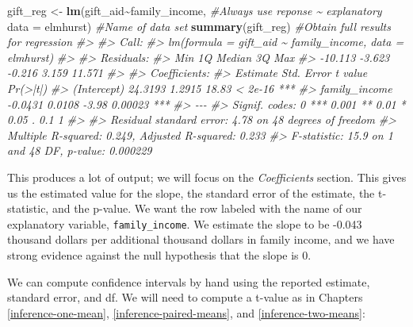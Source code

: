 \documentclass[
  10pt,
  openany]{book}
\newenvironment{Shaded}{\begin{snugshade}}{\end{snugshade}}
\newcommand{\AttributeTok}[1]{\textcolor[rgb]{0.13,0.29,0.53}{#1}}
\newcommand{\CommentTok}[1]{\textcolor[rgb]{0.56,0.35,0.01}{\textit{#1}}}
\newcommand{\FunctionTok}[1]{\textcolor[rgb]{0.13,0.29,0.53}{\textbf{#1}}}
\newcommand{\NormalTok}[1]{#1}
\newcommand{\OtherTok}[1]{\textcolor[rgb]{0.56,0.35,0.01}{#1}}
\newcommand{\SpecialCharTok}[1]{\textcolor[rgb]{0.81,0.36,0.00}{\textbf{#1}}}
\theoremstyle{definition}
\theoremstyle{definition}
\theoremstyle{definition}
\theoremstyle{definition}
\theoremstyle{remark}
\begin{document}
\begin{Shaded}
\begin{Highlighting}[]
\NormalTok{gift\_reg }\OtherTok{\textless{}{-}} \FunctionTok{lm}\NormalTok{(gift\_aid}\SpecialCharTok{\textasciitilde{}}\NormalTok{family\_income, }\CommentTok{\#Always use reponse \textasciitilde{} explanatory}
               \AttributeTok{data =}\NormalTok{ elmhurst)  }\CommentTok{\#Name of data set}
\FunctionTok{summary}\NormalTok{(gift\_reg)  }\CommentTok{\#Obtain full results for regression}
\CommentTok{\#\textgreater{} }
\CommentTok{\#\textgreater{} Call:}
\CommentTok{\#\textgreater{} lm(formula = gift\_aid \textasciitilde{} family\_income, data = elmhurst)}
\CommentTok{\#\textgreater{} }
\CommentTok{\#\textgreater{} Residuals:}
\CommentTok{\#\textgreater{}     Min      1Q  Median      3Q     Max }
\CommentTok{\#\textgreater{} {-}10.113  {-}3.623  {-}0.216   3.159  11.571 }
\CommentTok{\#\textgreater{} }
\CommentTok{\#\textgreater{} Coefficients:}
\CommentTok{\#\textgreater{}               Estimate Std. Error t value Pr(\textgreater{}|t|)    }
\CommentTok{\#\textgreater{} (Intercept)    24.3193     1.2915   18.83  \textless{} 2e{-}16 ***}
\CommentTok{\#\textgreater{} family\_income  {-}0.0431     0.0108   {-}3.98  0.00023 ***}
\CommentTok{\#\textgreater{} {-}{-}{-}}
\CommentTok{\#\textgreater{} Signif. codes:  0 \textquotesingle{}***\textquotesingle{} 0.001 \textquotesingle{}**\textquotesingle{} 0.01 \textquotesingle{}*\textquotesingle{} 0.05 \textquotesingle{}.\textquotesingle{} 0.1 \textquotesingle{} \textquotesingle{} 1}
\CommentTok{\#\textgreater{} }
\CommentTok{\#\textgreater{} Residual standard error: 4.78 on 48 degrees of freedom}
\CommentTok{\#\textgreater{} Multiple R{-}squared:  0.249,  Adjusted R{-}squared:  0.233 }
\CommentTok{\#\textgreater{} F{-}statistic: 15.9 on 1 and 48 DF,  p{-}value: 0.000229}
\end{Highlighting}
\end{Shaded}

This produces a lot of output; we will focus on the \emph{Coefficients} section. This gives us the estimated value for the slope, the standard error of the estimate, the t-statistic, and the p-value. We want the row labeled with the name of our explanatory variable, \texttt{family\_income}. We estimate the slope to be -0.043 thousand dollars per additional thousand dollars in family income, and we have strong evidence against the null hypothesis that the slope is 0.

We can compute confidence intervals by hand using the reported estimate, standard error, and df. We will need to compute a t-value as in Chapters \ref{inference-one-mean}, \ref{inference-paired-means}, and \ref{inference-two-means}:
\end{document}
